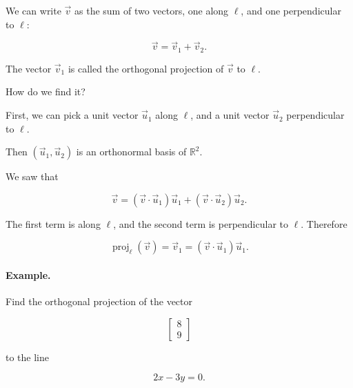 We can write $\vec v$ as the sum of two vectors, one along $\ell$, and one
perpendicular to $\ell$:

\[
\vec v=\vec v_1+\vec v_2.
\]

The vector $\vec v_1$ is called the orthogonal projection of $\vec v$ to
$\ell$.

How do we find it?

First, we can pick a unit vector $\vec u_1$ along $\ell$, and a unit vector
$\vec u_2$ perpendicular to $\ell$.

Then $(\vec u_1,\vec u_2)$ is an orthonormal basis of $\mathbb{R}^2$.

We saw that

\[
\vec v
=
(\vec v\cdot \vec u_1)\vec u_1
+
(\vec v\cdot \vec u_2)\vec u_2.
\]

The first term is along $\ell$, and the second term is perpendicular to $\ell$.
Therefore

\[
\operatorname{proj}_{\ell}(\vec v)
=
\vec v_1
=
(\vec v\cdot \vec u_1)\vec u_1.
\]

\paragraph{Example.}
Find the orthogonal projection of the vector

\[
\begin{bmatrix}
8\\
9
\end{bmatrix}
\]

to the line

\[
2x-3y=0.
\]


